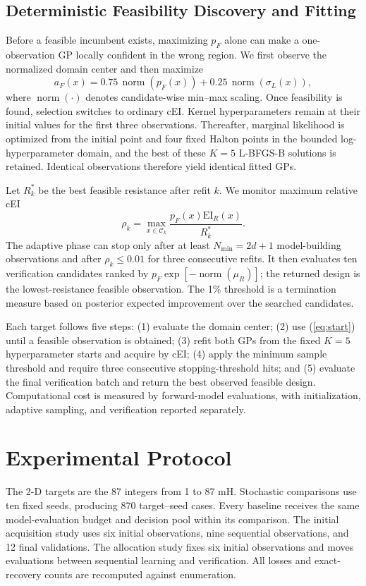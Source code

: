 \documentclass[10pt,conference,letterpaper]{IEEEtran}
\begin{document}
\subsection{Deterministic Feasibility Discovery and Fitting}
Before a feasible incumbent exists, maximizing $p_F$ alone can make a one-observation GP locally confident in the wrong region. We first observe the normalized domain center and then maximize
\begin{equation}
 a_F(x)=0.75\,\operatorname{norm}(p_F(x))
       +0.25\,\operatorname{norm}(\sigma_L(x)),
 \label{eq:start}
\end{equation}
where $\operatorname{norm}(\cdot)$ denotes candidate-wise min--max scaling. Once feasibility is found, selection switches to ordinary cEI. Kernel hyperparameters remain at their initial values for the first three observations. Thereafter, marginal likelihood is optimized from the initial point and four fixed Halton points in the bounded log-hyperparameter domain, and the best of these $K=5$ L-BFGS-B solutions is retained. Identical observations therefore yield identical fitted GPs.

Let $R_k^*$ be the best feasible resistance after refit $k$. We monitor maximum relative cEI
\begin{equation}
 \rho_k=\max_{x\in\mathcal C_k}
 \frac{p_F(x)\mathrm{EI}_R(x)}{R_k^*}.
 \label{eq:stop}
\end{equation}
The adaptive phase can stop only after at least $N_{\min}=2d+1$ model-building observations and after $\rho_k\leq0.01$ for three consecutive refits. It then evaluates ten verification candidates ranked by $p_F\exp[-\operatorname{norm}(\mu_R)]$; the returned design is the lowest-resistance feasible observation. The 1\% threshold is a termination measure based on posterior expected improvement over the searched candidates.

Each target follows five steps: (1) evaluate the domain center; (2) use (\ref{eq:start}) until a feasible observation is obtained; (3) refit both GPs from the fixed $K=5$ hyperparameter starts and acquire by cEI; (4) apply the minimum sample threshold and require three consecutive stopping-threshold hits; and (5) evaluate the final verification batch and return the best observed feasible design. Computational cost is measured by forward-model evaluations, with initialization, adaptive sampling, and verification reported separately.

\section{Experimental Protocol}
The 2-D targets are the 87 integers from 1 to 87 mH. Stochastic comparisons use ten fixed seeds, producing 870 target--seed cases. Every baseline receives the same model-evaluation budget and decision pool within its comparison. The initial acquisition study uses six initial observations, nine sequential observations, and 12 final validations. The allocation study fixes six initial observations and moves evaluations between sequential learning and verification. All losses and exact-recovery counts are recomputed against enumeration.
\end{document}
